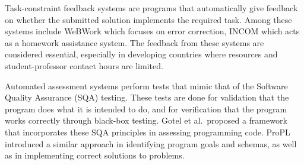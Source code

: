 Task-constraint feedback systems are programs that automatically give feedback on whether the 
submitted solution implements the required task. Among these systems include 
WeBWork\cite{gotel2008teaching} 
which focuses on error correction, INCOM\cite{le2009evaluation} which acts as a homework assistance system. 
The feedback from these systems are considered essential, especially in developing countries where resources 
and student-professor contact hours are limited.

Automated assessment systems perform tests that mimic that of the Software Quality Assurance (SQA) 
testing\cite{gotel2008teaching}. These tests are 
done for validation that the program does what it is intended to do, and for verification that the 
program works correctly through black-box testing. Gotel et al.\ proposed a framework that incorporates 
these SQA principles in assessing programming code. ProPL\cite{lane2005teaching} introduced a similar 
approach in identifying program goals and schemas, as well as in implementing correct solutions to problems.